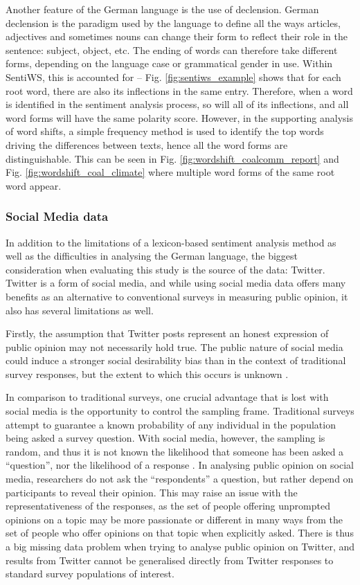 \documentclass[12pt,onecolumn,twoside]{layout}
\begin{document}
Another feature of the German language is the use of declension. German declension is the paradigm used by the language to define all the ways articles, adjectives and sometimes nouns can change their form to reflect their role in the sentence: subject, object, etc. The ending of words can therefore take different forms, depending on the language case or grammatical gender in use. Within SentiWS, this is accounted for -- Fig. \ref{fig:sentiws_example} shows that for each root word, there are also its inflections in the same entry. Therefore, when a word is identified in the sentiment analysis process, so will all of its inflections, and all word forms will have the same polarity score. However, in the supporting analysis of word shifts, a simple frequency method is used to identify the top words driving the differences between texts, hence all the word forms are distinguishable. This can be seen in Fig. \ref{fig:wordshift_coalcomm_report} and Fig. \ref{fig:wordshift_coal_climate} where multiple word forms of the same root word appear. 

\subsubsection*{Social Media data} 
In addition to the limitations of a lexicon-based sentiment analysis method as well as the difficulties in analysing the German language, the biggest consideration when evaluating this study is the source of the data: Twitter. Twitter is a form of social media, and while using social media data offers many benefits as an alternative to conventional surveys in measuring public opinion, it also has several limitations as well. 

Firstly, the assumption that Twitter posts represent an honest expression of public opinion may not necessarily hold true. The public nature of social media could induce a stronger social desirability bias than in the context of traditional survey responses, but the extent to which this occurs is unknown \cite{Klasnja2018}. 

In comparison to traditional surveys, one crucial advantage that is lost with social media is the opportunity to control the sampling frame. Traditional surveys attempt to guarantee a known probability of any individual in the population being asked a survey question. With social media, however, the sampling is random, and thus it is not known the likelihood that someone has been asked a ``question'', nor the likelihood of a response \cite{Klasnja2018}. In analysing public opinion on social media, researchers do not ask the ``respondents'' a question, but rather depend on participants to reveal their opinion. This may raise an issue with the representativeness of the responses, as the set of people offering unprompted opinions on a topic may be more passionate or different in many ways from the set of people who offer opinions on that topic when explicitly asked. There is thus a big missing data problem when trying to analyse public opinion on Twitter, and results from Twitter cannot be generalised directly from Twitter responses to standard survey populations of interest. 
\end{document}
